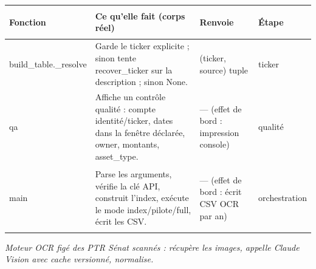 \documentclass[11pt,a4paper]{article}
\makeatletter
\newenvironment{fnt}{%
  \par\footnotesize
  \setlength{\tabcolsep}{3pt}%
  \begin{longtable}{@{}>{\ttfamily\scriptsize\raggedright\arraybackslash}p{3.0cm} >{\raggedright\arraybackslash}p{7.5cm} >{\itshape\scriptsize\raggedright\arraybackslash}p{2.7cm} >{\scriptsize\raggedright\arraybackslash}p{1.85cm}@{}}
  \toprule
  \normalfont\bfseries\scriptsize Fonction & \bfseries\scriptsize Ce qu'elle fait (corps réel) &
  \normalfont\bfseries\scriptsize Renvoie & \normalfont\bfseries\scriptsize Étape\\
  \midrule\endhead
}{\bottomrule\end{longtable}\par}
\newcommand{\fnmod}[2]{\par\smallskip\noindent{\ttfamily\bfseries #1}\;\textmd{\itshape\small\textemdash{} #2}\par\nobreak\vspace{2pt}}
\makeatother
\begin{document}
\begin{fnt}
build_\allowbreak table.\allowbreak _\allowbreak resolve & Garde le ticker explicite ; sinon tente recover_ticker sur la description ; sinon None. & (ticker,\allowbreak{} source)\allowbreak{} tuple & ticker \\
qa & Affiche un contrôle qualité : compte identité/\allowbreak{}ticker,\allowbreak{} dates dans la fenêtre déclarée,\allowbreak{} owner,\allowbreak{} montants,\allowbreak{} asset_type. & — (effet de bord : impression console)\allowbreak{} & qualité \\
main & Parse les arguments,\allowbreak{} vérifie la clé API,\allowbreak{} construit l'index,\allowbreak{} exécute le mode index/\allowbreak{}pilote/\allowbreak{}full,\allowbreak{} écrit les CSV. & — (effet de bord : écrit CSV OCR par an)\allowbreak{} & orchestration \\
\end{fnt}
\fnmod{ocr_engine.py}{Moteur OCR figé des PTR Sénat scannés : récupère les images, appelle Claude Vision avec cache versionné, normalise.}
\end{document}

